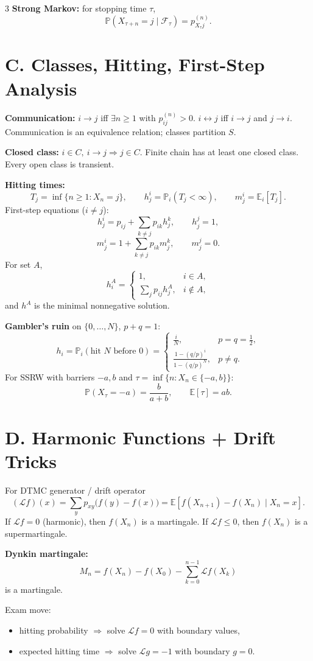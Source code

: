 \documentclass[8pt]{extarticle}
\newcommand{\PP}{\mathbb{P}}
\newcommand{\E}{\mathbb{E}}
\newcommand{\1}{\mathbf{1}}
\newcommand{\cF}{\mathcal{F}}
\begin{document}
\begin{multicols*}{3}
\textbf{Strong Markov:} for stopping time $\tau$,
\[
\PP(X_{\tau+n}=j\mid \cF_\tau)=p_{X_\tau j}^{(n)}.
\]

\section*{C. Classes, Hitting, First-Step Analysis}
\textbf{Communication:} $i\to j$ iff $\exists n\ge1$ with $p_{ij}^{(n)}>0$.
$i\leftrightarrow j$ iff $i\to j$ and $j\to i$.
Communication is an equivalence relation; classes partition $S$.

\textbf{Closed class:} $i\in C,\ i\to j \Rightarrow j\in C$.
Finite chain has at least one closed class. Every open class is transient.

\textbf{Hitting times:}
\[
T_j=\inf\{n\ge1:X_n=j\},\qquad
h_j^i=\PP_i(T_j<\infty),\qquad m_j^i=\E_i[T_j].
\]
First-step equations ($i\neq j$):
\[
h_j^i=p_{ij}+\sum_{k\neq j}p_{ik}h_j^k,\qquad h_j^j=1,
\]
\[
m_j^i=1+\sum_{k\neq j}p_{ik}m_j^k,\qquad m_j^j=0.
\]
For set $A$,
\[
h_i^A=
\begin{cases}
1,& i\in A,\\
\sum_j p_{ij}h_j^A,& i\notin A,
\end{cases}
\]
and $h^A$ is the minimal nonnegative solution.

\textbf{Gambler's ruin} on $\{0,\dots,N\}$, $p+q=1$:
\[
h_i=\PP_i(\text{hit }N\text{ before }0)=
\begin{cases}
\frac{i}{N},& p=q=\frac12,\\[4pt]
\frac{1-(q/p)^i}{1-(q/p)^N},& p\neq q.
\end{cases}
\]
For SSRW with barriers $-a,b$ and $\tau=\inf\{n:X_n\in\{-a,b\}\}$:
\[
\PP(X_\tau=-a)=\frac{b}{a+b},\qquad \E[\tau]=ab.
\]

\section*{D. Harmonic Functions + Drift Tricks}
For DTMC generator / drift operator
\[
(\mathcal L f)(x)=\sum_y p_{xy}\bigl(f(y)-f(x)\bigr)=\E[f(X_{n+1})-f(X_n)\mid X_n=x].
\]
If $\mathcal L f=0$ (harmonic), then $f(X_n)$ is a martingale.
If $\mathcal L f\le0$, then $f(X_n)$ is a supermartingale.

\textbf{Dynkin martingale:}
\[
M_n=f(X_n)-f(X_0)-\sum_{k=0}^{n-1}\mathcal L f(X_k)
\]
is a martingale.

Exam move:
\begin{itemize}
\item hitting probability $\Rightarrow$ solve $\mathcal L f=0$ with boundary values,
\item expected hitting time $\Rightarrow$ solve $\mathcal L g=-1$ with boundary $g=0$.
\end{itemize}


\end{multicols*}
\end{document}
